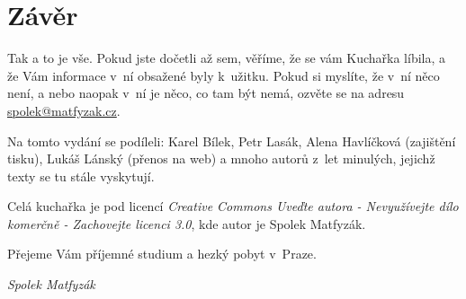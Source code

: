 \section{Závěr}

Tak a to je vše. Pokud jste dočetli až sem, věříme, že se vám
Kuchařka líbila, a že Vám informace v~ní obsažené byly k~užitku.
Pokud si myslíte, že v~ní něco není, a nebo naopak v~ní je něco,
co tam být nemá, ozvěte se na adresu \url{spolek@matfyzak.cz}.

Na tomto vydání se podíleli: Karel Bílek, Petr Lasák, Alena Havlíčková
(zajištění tisku), Lukáš Lánský (přenos na web) a mnoho autorů z~let minulých, jejichž texty
se tu stále vyskytují. 

Celá kuchařka je pod licencí \textit{Creative Commons Uveďte autora - Nevyužívejte dílo komerčně - Zachovejte licenci 3.0}, kde autor je {Spolek Matfyzák}.

\medskip

Přejeme Vám příjemné studium a hezký pobyt v~Praze.

\hskip 8cm \it Spolek Matfyzák